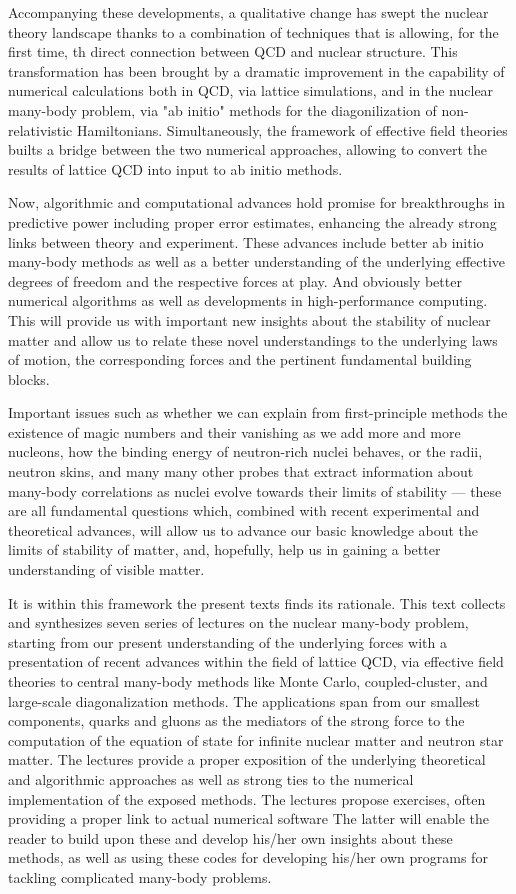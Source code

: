 Accompanying these developments, a qualitative change has swept the
nuclear theory landscape thanks to a combination of techniques that is
allowing, for the first time, th direct connection between QCD and
nuclear structure. This transformation has been brought by a dramatic
improvement in the capability of numerical calculations both in QCD,
via lattice simulations, and in the nuclear many-body problem, via "ab
initio" methods for the diagonilization of non-relativistic
Hamiltonians. Simultaneously, the framework of effective field
theories builts a bridge between the two numerical approaches,
allowing to convert the results of lattice QCD into input to ab initio
methods.

Now, algorithmic and computational advances hold promise for
breakthroughs in predictive power including proper error estimates,
enhancing the already strong links between theory and experiment.
These advances include better ab initio many-body methods as well as a
better understanding of the underlying effective degrees of freedom
and the respective forces at play.  And obviously better numerical
algorithms as well as developments in high-performance computing.
This will provide us with important new insights about the stability
of nuclear matter and allow us to relate these novel understandings to
the underlying laws of motion, the corresponding forces and the
pertinent fundamental building blocks.

Important issues such as whether we can explain from first-principle
methods the existence of magic numbers and their vanishing as we add
more and more nucleons, how the binding energy of neutron-rich nuclei
behaves, or the radii, neutron skins, and many many other probes that
extract information about many-body correlations as nuclei evolve
towards their limits of stability --- these are all fundamental
questions which, combined with recent experimental and theoretical
advances, will allow us to advance our basic knowledge about the
limits of stability of matter, and, hopefully, help us in gaining a
better understanding of visible matter.

It is within this framework the present texts finds its rationale.
This text collects and synthesizes seven series of lectures on the
nuclear many-body problem, starting from our present understanding of
the underlying forces with a presentation of recent advances within
the field of lattice QCD, via effective field theories to central
many-body methods like Monte Carlo, coupled-cluster, and large-scale
diagonalization methods.  The applications span from our smallest
components, quarks and gluons as the mediators of the strong force to
the computation of the equation of state for infinite nuclear matter
and neutron star matter.  The lectures provide a proper exposition of
the underlying theoretical and algorithmic approaches as well as
strong ties to the numerical implementation of the exposed methods.
The lectures propose exercises, often providing a proper link to
actual numerical software The latter will enable the reader to build
upon these and develop his/her own insights about these methods, as
well as using these codes for developing his/her own programs for
tackling complicated many-body problems.





